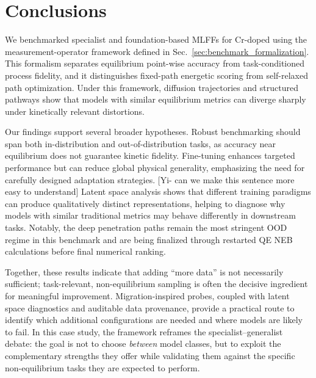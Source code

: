 \documentclass[pdflatex,sn-mathphys-num]{sn-jnl}%
\providecommand{\reviewermap}[3]{}
\theoremstyle{thmstyleone}%
\theoremstyle{thmstyletwo}%
\theoremstyle{thmstylethree}%
\begin{document}
\section{Conclusions}


We benchmarked specialist and foundation-based MLFFs for Cr-doped  using the measurement-operator framework defined in Sec.~\ref{sec:benchmark_formalization}. This formalism separates equilibrium point-wise accuracy from task-conditioned process fidelity, and it distinguishes fixed-path energetic scoring from self-relaxed path optimization. Under this framework, diffusion trajectories and structured pathways show that models with similar equilibrium metrics can diverge sharply under kinetically relevant distortions.

\reviewermap{REV-A4}{done-local}{Broader principles are now framed as case-study hypotheses requiring cross-system validation.}

Our findings support several broader hypotheses. Robust benchmarking should span both in-distribution and out-of-distribution tasks, as accuracy near equilibrium does not guarantee kinetic fidelity. Fine-tuning enhances targeted performance but can reduce global physical generality, emphasizing the need for carefully designed adaptation strategies. [Yi- can we make this sentence more easy to understand] Latent space analysis shows that different training paradigms can produce qualitatively distinct representations, helping to diagnose why models with similar traditional metrics may behave differently in downstream tasks. Notably, the deep penetration paths remain the most stringent OOD regime in this benchmark and are being finalized through restarted QE NEB calculations before final numerical ranking.

\reviewermap{REV-A4}{done-local}{Conclusion should keep framework generality as future validation rather than a final claim.}
Together, these results indicate that adding ``more data'' is not necessarily sufficient; task-relevant, non-equilibrium sampling is often the decisive ingredient for meaningful improvement. Migration-inspired probes, coupled with latent space diagnostics and auditable data provenance, provide a practical route to identify which additional configurations are needed and where models are likely to fail. In this case study, the framework reframes the specialist--generalist debate: the goal is not to choose \textit{between} model classes, but to exploit the complementary strengths they offer while validating them against the specific non-equilibrium tasks they are expected to perform.
\end{document}
